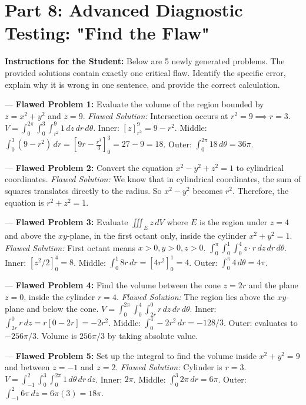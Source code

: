 \documentclass[11pt]{article}
\begin{document}
\newpage
\section{Part 8: Advanced Diagnostic Testing: "Find the Flaw"}

\textbf{Instructions for the Student:} Below are 5 newly generated problems. The provided solutions contain exactly one critical flaw. Identify the specific error, explain why it is wrong in one sentence, and provide the correct calculation.

---
\textbf{Flawed Problem 1:} 
Evaluate the volume of the region bounded by $z = x^2 + y^2$ and $z = 9$.
\textit{Flawed Solution:} 
Intersection occurs at $r^2 = 9 \implies r = 3$. 
$V = \int_0^{2\pi} \int_0^3 \int_{r^2}^9 1 \, dz \, dr \, d\theta$.
Inner: $[z]_{r^2}^9 = 9 - r^2$. 
Middle: $\int_0^3 (9 - r^2) \, dr = [9r - \frac{r^3}{3}]_0^3 = 27 - 9 = 18$.
Outer: $\int_0^{2\pi} 18 \, d\theta = 36\pi$.

---
\textbf{Flawed Problem 2:}
Convert the equation $x^2 - y^2 + z^2 = 1$ to cylindrical coordinates.
\textit{Flawed Solution:}
We know that in cylindrical coordinates, the sum of squares translates directly to the radius. So $x^2 - y^2$ becomes $r^2$.
Therefore, the equation is $r^2 + z^2 = 1$.

---
\textbf{Flawed Problem 3:}
Evaluate $\iiint_E z \, dV$ where $E$ is the region under $z=4$ and above the $xy$-plane, in the first octant only, inside the cylinder $x^2+y^2=1$.
\textit{Flawed Solution:}
First octant means $x>0, y>0, z>0$. 
$\int_0^{\pi} \int_0^1 \int_0^4 z \cdot r \, dz \, dr \, d\theta$.
Inner: $[z^2/2]_0^4 = 8$.
Middle: $\int_0^1 8r \, dr = [4r^2]_0^1 = 4$.
Outer: $\int_0^{\pi} 4 \, d\theta = 4\pi$.

---
\textbf{Flawed Problem 4:}
Find the volume between the cone $z = 2r$ and the plane $z=0$, inside the cylinder $r=4$.
\textit{Flawed Solution:}
The region lies above the $xy$-plane and below the cone.
$V = \int_0^{2\pi} \int_0^4 \int_{2r}^0 r \, dz \, dr \, d\theta$.
Inner: $\int_{2r}^0 r \, dz = r[0 - 2r] = -2r^2$.
Middle: $\int_0^4 -2r^2 \, dr = -128/3$.
Outer: evaluates to $-256\pi/3$. Volume is $256\pi/3$ by taking absolute value.

---
\textbf{Flawed Problem 5:}
Set up the integral to find the volume inside $x^2+y^2=9$ and between $z=-1$ and $z=2$.
\textit{Flawed Solution:}
Cylinder is $r=3$.
$V = \int_{-1}^{2} \int_{0}^{3} \int_{0}^{2\pi} 1 \, d\theta \, dr \, dz$.
Inner: $2\pi$. 
Middle: $\int_0^3 2\pi \, dr = 6\pi$.
Outer: $\int_{-1}^2 6\pi \, dz = 6\pi(3) = 18\pi$.
\end{document}
